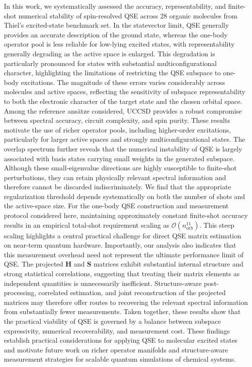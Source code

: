 In this work, we systematically assessed the accuracy, representability, and finite-shot numerical stability of spin-resolved QSE across 28 organic molecules from Thiel's excited-state benchmark set. In the statevector limit, QSE generally provides an accurate description of the ground state, whereas the one-body operator pool is less reliable for low-lying excited states, with representability generally degrading as the active space is enlarged. This degradation is particularly pronounced for states with substantial multiconfigurational character, highlighting the limitations of restricting the QSE subspace to one-body excitations. The magnitude of these errors varies considerably across molecules and active spaces, reflecting the sensitivity of subspace representability to both the electronic character of the target state and the chosen orbital space. Among the reference ansätze considered, UCCSD provides a robust compromise between spectral accuracy, circuit complexity, and spin purity. These results motivate the use of richer operator pools, including higher-order excitations, particularly for larger active spaces and strongly multiconfigurational states.
The overlap spectrum further reveals that the numerical instability of QSE is largely associated with basis states carrying small weights in the generated subspace. Although these small-eigenvalue directions are highly susceptible to finite-shot perturbations, they can retain physically relevant spectral information and therefore cannot be discarded indiscriminately. We find that the appropriate regularization threshold depends systematically on both the number of shots and the active-space size. For the one-body QSE construction and measurement protocol considered here, maintaining approximately constant finite-shot accuracy results in an empirical total-shot requirement scaling as $\mathcal{O}\left(n_{\mathrm{orb}}^{11}\right)$. This steep scaling highlights a central practical challenge for direct QSE matrix estimation on near-term quantum hardware.
Importantly, our analysis also indicates that this measurement overhead need not represent the ultimate performance limit of QSE. The projected $\mathbf{H}$ and $\mathbf{S}$ matrices exhibit substantial internal structure and strong statistical correlations, suggesting that treating their matrix elements as independent quantities is unnecessarily inefficient. Structure-aware post-processing, correlated estimation, and joint reconstruction of the projected matrices may therefore offer routes to recovering the relevant spectral information from substantially fewer measurements. Taken together, these results show that the practical viability of QSE is governed by a balance between subspace expressivity, numerical recoverability, and measurement cost. These findings establish practical considerations for applying QSE to molecular excited states and motivate future work on richer operator manifolds and structure-aware measurement strategies for scalable quantum simulations of chemical systems.
